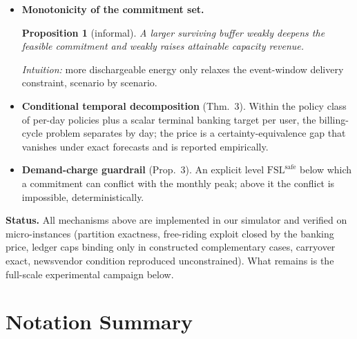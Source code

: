 \documentclass[letterpaper]{article}
\newtheorem{proposition}{Proposition}
\newcommand{\FSL}{\mathrm{FSL}}
\newcommand{\winc}{w^{\mathrm{inc}}}            %
\newcommand{\Fsafe}{\FSL^{\mathrm{safe}}}           %
\begin{document}
\begin{itemize}
the deployed range $\lambda < 1$ is priced risk aversion; the interior
regime appears when the penalty dominates. The risk overlay is
load-bearing at program rates, which we will characterize by sweeping
$\winc$ across the regime boundary.
\item \textbf{Monotonicity of the commitment set.}
\begin{proposition}[informal]\label{prop:monotone}
A larger surviving buffer weakly deepens the feasible commitment and
weakly raises attainable capacity revenue.
\end{proposition}
\emph{Intuition:} more dischargeable energy only relaxes the
event-window delivery constraint, scenario by scenario.
\item \textbf{Conditional temporal decomposition} (Thm.~3). Within the
policy class of per-day policies plus a scalar terminal banking target
per user, the billing-cycle problem separates by day; the price is a
certainty-equivalence gap that vanishes under exact forecasts and is
reported empirically.
\item \textbf{Demand-charge guardrail} (Prop.~3). An explicit level
$\Fsafe$ below which a commitment can conflict with the monthly peak;
above it the conflict is impossible, deterministically.
\end{itemize}

\noindent\textbf{Status.} All mechanisms above are implemented in our
simulator and verified on micro-instances (partition exactness,
free-riding exploit closed by the banking price, ledger caps binding
only in constructed complementary cases, carryover exact, newsvendor
condition reproduced unconstrained). What remains is the full-scale
experimental campaign below.


\section{Notation Summary}\label{sec:notation}
\end{document}
